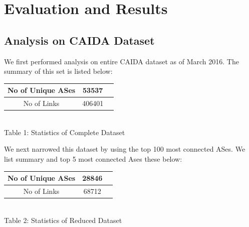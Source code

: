 \documentclass{sig-alternate-05-2015}
\begin{document}
\section{Evaluation and Results}
\subsection{Analysis on CAIDA Dataset}
We first performed analysis on entire CAIDA dataset as of March 2016. The summary of this set is listed below:

\begin{center}
\begin{tabular}{ |c|c|c| } 
 \hline
 No of Unique ASes & 53537 \\ 
 \hline
 No of Links & 406401 \\ 
 \hline
\end{tabular}
\\Table 1: Statistics of Complete Dataset\\
\end{center}

We next narrowed this dataset by using the top 100 most connected ASes. We list summary and top 5 most connected Ases these below:

\begin{center}
\begin{tabular}{ |c|c|c| } 
 \hline
 No of Unique ASes & 28846 \\ 
 \hline
 No of Links & 68712 \\ 
 \hline
\end{tabular}
\\Table 2: Statistics of Reduced Dataset\\
\end{center}
\end{document}
